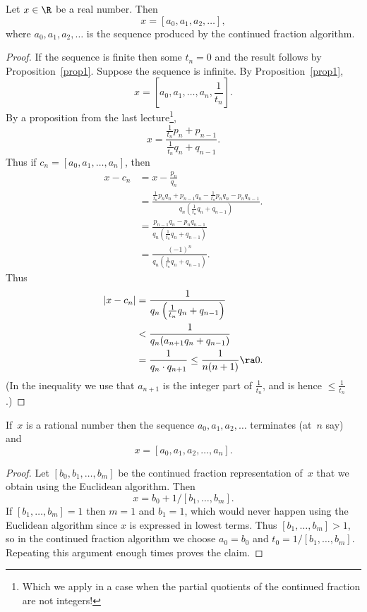 \documentclass[11pt]{report}
\begin{document}
\begin{theorem}
  Let $x\in\R$ be a real number.  Then
  $$
    x = [a_0, a_1, a_2, \ldots],
  $$
  where $a_0, a_1, a_2,\ldots$ is the sequence produced by the continued fraction algorithm.
\end{theorem}
\begin{proof}
  If the sequence is finite then some $t_n=0$ and the
  result follows by Proposition~\ref{prop1}.
  Suppose the sequence is infinite.
  By Proposition~\ref{prop1},
  $$
    x = [a_0, a_1, \ldots, a_n, \frac{1}{t_n}].
  $$
  By a proposition from the last lecture\footnote{Which we apply in a case when
    the partial quotients of the continued fraction are not integers!},
  $$
    x = \frac{\frac{1}{t_n} p_n + p_{n-1}}{\frac{1}{t_n} q_n + q_{n-1}}.
  $$
  Thus if $c_n = [a_0, a_1, \ldots, a_n]$, then
  \begin{align*}
    x - c_n & = x - \frac{p_n}{q_n}                                                             \\
            & =\frac{\frac{1}{t_n} p_n q_n + p_{n-1} q_n - \frac{1}{t_n} p_n q_n - p_n q_{n-1}}
    {q_n \left(\frac{1}{t_n} q_n + q_{n-1}\right)}.                                             \\
            & = \frac{p_{n-1} q_n - p_{n}q_{n-1}}{q_n\left(\frac{1}{t_n} q_n + q_{n-1}\right)}  \\
            & = \frac{(-1)^n}{q_n\left(\frac{1}{t_n} q_n + q_{n-1}\right)}.
  \end{align*}
  Thus
  \begin{align*}
    |x - c_n| & = \frac{1}{q_n\left(\frac{1}{t_n} q_n + q_{n-1}\right)}    \\
              & < \frac{1}{q_n(a_{n+1} q_n + q_{n-1})}                     \\
              & = \frac{1}{q_n \cdot q_{n+1}} \leq \frac{1}{n(n+1)} \ra 0.
  \end{align*}
  (In the inequality we use that $a_{n+1}$ is the integer part of $\frac{1}{t_n}$, and
  is hence $\leq \frac{1}{t_n}$.)

\end{proof}





\begin{proposition}\label{prop}
  If~$x$ is a rational number then the sequence
  $a_0, a_1, a_2, \ldots $
  terminates (at~$n$ say) and
  $$x = [a_0, a_1, a_2, \ldots, a_n].$$
\end{proposition}
\begin{proof}
  Let $[b_0,b_1,\ldots, b_m]$ be the continued fraction representation
  of~$x$ that we obtain using the Euclidean algorithm.  Then
  $$
    x = b_0 + 1/[b_1,\ldots,b_m].
  $$
  If $[b_1,\ldots,b_m]=1$ then $m=1$ and $b_1=1$, which would never
  happen using the Euclidean algorithm since $x$ is expressed in lowest
  terms.  Thus $[b_1,\ldots,b_m]>1$, so in the continued fraction
  algorithm we choose $a_0 = b_0$ and $t_0 = 1/[b_1, \ldots, b_m]$.
  Repeating this argument enough times proves the claim.
\end{proof}
\end{document}
